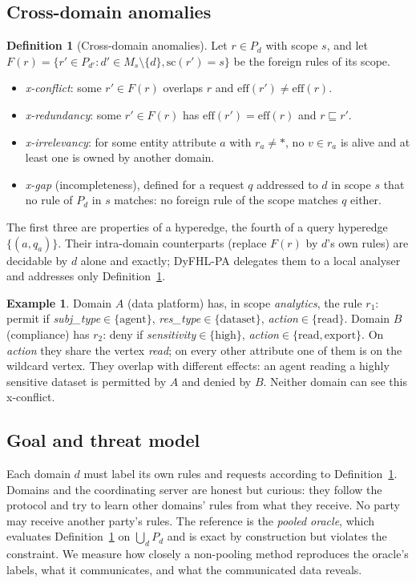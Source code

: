 \documentclass[preprint,12pt]{elsarticle}
\theoremstyle{definition}
\newtheorem{definition}{Definition}
\newtheorem{example}{Example}
\newcommand{\name}{DyFHL-PA\xspace}
\newcommand{\eff}{\mathrm{eff}}
\newcommand{\scp}{\mathrm{sc}}
\begin{document}
\subsection{Cross-domain anomalies}
\begin{definition}[Cross-domain anomalies]
\label{def:anom}
Let $r\in P_d$ with scope $s$, and let $F(r)=\{r'\in P_{d'}: d'\in M_s\setminus\{d\}, \scp(r')=s\}$ be the foreign rules of its scope.
\begin{itemize}
\item \emph{x-conflict}: some $r'\in F(r)$ overlaps $r$ and $\eff(r')\neq\eff(r)$.
\item \emph{x-redundancy}: some $r'\in F(r)$ has $\eff(r')=\eff(r)$ and $r\sqsubseteq r'$.
\item \emph{x-irrelevancy}: for some entity attribute $a$ with $r_a\neq\ast$, no $v\in r_a$ is alive and at least one is owned by another domain.
\item \emph{x-gap} (incompleteness), defined for a request $q$ addressed to $d$ in scope $s$ that no rule of $P_d$ in $s$ matches: no foreign rule of the scope matches $q$ either.
\end{itemize}
\end{definition}
The first three are properties of a hyperedge, the fourth of a query hyperedge $\{(a,q_a)\}$. Their intra-domain counterparts (replace $F(r)$ by $d$'s own rules) are decidable by $d$ alone and exactly; \name delegates them to a local analyser and addresses only Definition~\ref{def:anom}.

\begin{example}
Domain $A$ (data platform) has, in scope \emph{analytics}, the rule $r_1$: \textsf{permit} if \textit{subj\_type}$\in\{\text{agent}\}$, \textit{res\_type}$\in\{\text{dataset}\}$, \textit{action}$\in\{\text{read}\}$. Domain $B$ (compliance) has $r_2$: \textsf{deny} if \textit{sensitivity}$\in\{\text{high}\}$, \textit{action}$\in\{\text{read},\text{export}\}$. On \textit{action} they share the vertex \emph{read}; on every other attribute one of them is on the wildcard vertex. They overlap with different effects: an agent reading a highly sensitive dataset is permitted by $A$ and denied by $B$. Neither domain can see this x-conflict.
\end{example}

\subsection{Goal and threat model}
Each domain $d$ must label its own rules and requests according to Definition~\ref{def:anom}. Domains and the coordinating server are honest but curious: they follow the protocol and try to learn other domains' rules from what they receive. No party may receive another party's rules. The reference is the \emph{pooled oracle}, which evaluates Definition~\ref{def:anom} on $\bigcup_d P_d$ and is exact by construction but violates the constraint. We measure how closely a non-pooling method reproduces the oracle's labels, what it communicates, and what the communicated data reveals.
\end{document}
